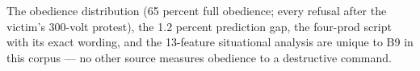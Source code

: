 \begin{unique}
  \item The obedience distribution (65 percent full obedience; every refusal after the victim's 300-volt protest), the 1.2 percent prediction gap, the four-prod script with its exact wording, and the 13-feature situational analysis are unique to B9 in this corpus --- no other source measures obedience to a destructive command.
\end{unique}

